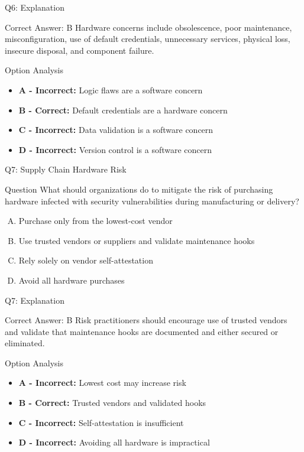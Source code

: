 \documentclass{beamer}
\begin{document}
	\begin{frame}{Q6: Explanation}
		\begin{block}{Correct Answer: B}
			Hardware concerns include obsolescence, poor maintenance, misconfiguration, use of default credentials, unnecessary services, physical loss, insecure disposal, and component failure.
		\end{block}
		\begin{block}{Option Analysis}
			\begin{itemize}
				\item \textbf{A - Incorrect:} Logic flaws are a software concern
				\item \textbf{B - Correct:} Default credentials are a hardware concern
				\item \textbf{C - Incorrect:} Data validation is a software concern
				\item \textbf{D - Incorrect:} Version control is a software concern
			\end{itemize}
		\end{block}
	\end{frame}
	
	\begin{frame}{Q7: Supply Chain Hardware Risk}
		\begin{block}{Question}
			What should organizations do to mitigate the risk of purchasing hardware infected with security vulnerabilities during manufacturing or delivery?
		\end{block}
		\begin{enumerate}[(A)]
			\item Purchase only from the lowest-cost vendor
			\item Use trusted vendors or suppliers and validate maintenance hooks
			\item Rely solely on vendor self-attestation
			\item Avoid all hardware purchases
		\end{enumerate}
	\end{frame}
	
	\begin{frame}{Q7: Explanation}
		\begin{block}{Correct Answer: B}
			Risk practitioners should encourage use of trusted vendors and validate that maintenance hooks are documented and either secured or eliminated.
		\end{block}
		\begin{block}{Option Analysis}
			\begin{itemize}
				\item \textbf{A - Incorrect:} Lowest cost may increase risk
				\item \textbf{B - Correct:} Trusted vendors and validated hooks
				\item \textbf{C - Incorrect:} Self-attestation is insufficient
				\item \textbf{D - Incorrect:} Avoiding all hardware is impractical
			\end{itemize}
		\end{block}
	\end{frame}
	
\end{document}
